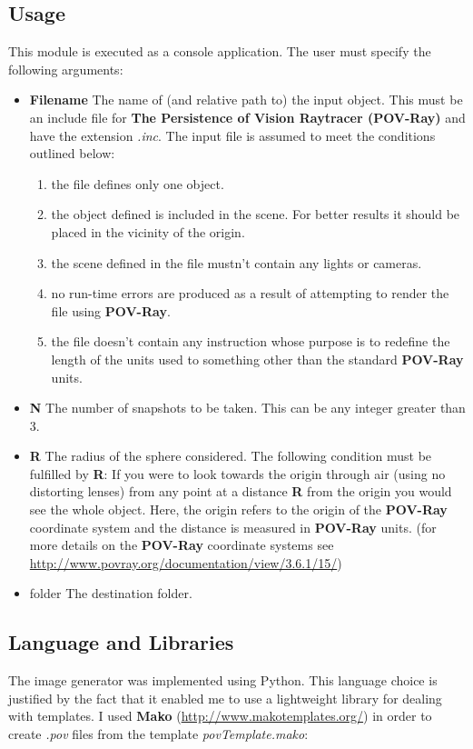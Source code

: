 \documentclass[12pt,a4paper,twoside,openright]{report}
\begin{document}
\subsection{Usage}
This module is executed as a console application. The user must specify the following arguments:
\begin{itemize}
\item \textbf{Filename} The name of (and relative path to) the input object. This must be an include file for \textbf{The Persistence of Vision Raytracer (POV-Ray)} and have the extension \textit{.inc}. The input file is assumed to meet the conditions outlined below:
	\begin{enumerate}
		\item the file defines only one object.
		\item the object defined is included in the scene. For better results it should be placed in the vicinity of the origin.
		\item the scene defined in the file mustn't contain any lights or cameras.
		\item no run-time errors are produced as a result of attempting to render the file using \textbf{POV-Ray}. 
		\item the file doesn't contain any instruction whose purpose is to redefine the length of the units used to something other than the standard \textbf{POV-Ray} units. 
	\end{enumerate}    
\item \textbf{N} The number of snapshots to be taken. This can be any integer greater than 3.
\item \textbf{R} The radius of the sphere considered. The following condition must be fulfilled by \textbf{R}: If you were to look towards the origin through air (using no distorting lenses) from any point at a distance \textbf{R} from the origin you would see the whole object. Here, the origin refers to the origin of the \textbf{POV-Ray} coordinate system and the distance is measured in \textbf{POV-Ray} units.  (for more details on the \textbf{POV-Ray} coordinate systems see \url{http://www.povray.org/documentation/view/3.6.1/15/})
\item {folder} The destination folder.
\end{itemize}

\subsection{Language and Libraries}
The image generator was implemented using Python. This language choice is justified by the fact that it enabled me to use a lightweight library for dealing with templates. I used \textbf{Mako} (\url{http://www.makotemplates.org/}) in order to create \textit{.pov} files from the template \textit{povTemplate.mako}: 
\end{document}
